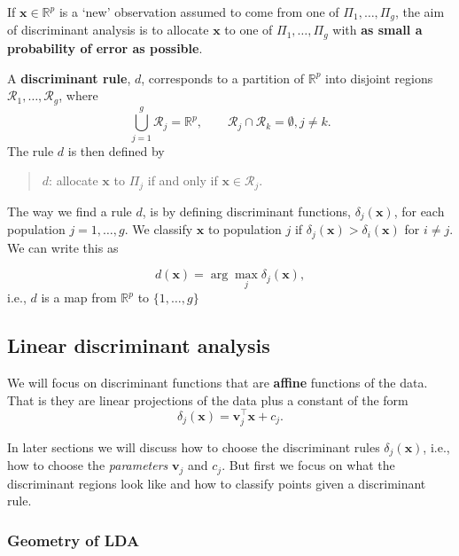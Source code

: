 \documentclass[
]{book}
\theoremstyle{definition}
\theoremstyle{definition}
\theoremstyle{definition}
\theoremstyle{definition}
\theoremstyle{remark}
\begin{document}
If \(\mathbf x\in \mathbb R^p\) is a `new' observation assumed to come from one of \(\Pi_1, \ldots , \Pi_g\), the aim of discriminant analysis is to allocate \(\mathbf x\) to one of \(\Pi_1, \ldots , \Pi_g\) with \textbf{as small a
probability of error as possible}.

A \textbf{discriminant rule}, \(d\), corresponds to a partition of \(\mathbb R^p\) into disjoint regions \(\mathcal R_1, \ldots, \mathcal R_g\), where
\[\bigcup_{j=1}^g \mathcal R_j = \mathbb R^p, \qquad \mathcal R_j \cap \mathcal R_k = \emptyset, j \neq k.\]
The rule \(d\) is then defined by

\begin{quote}
\(d\): allocate \(\mathbf x\) to \(\Pi_j\) if and only if \(\mathbf x\in \mathcal R_j\).
\end{quote}

The way we find a rule \(d\), is by defining discriminant functions, \(\delta_j(\mathbf x)\), for each population \(j=1, \ldots, g\). We classify \(\mathbf x\) to population \(j\) if \(\delta_j(\mathbf x)>\delta_i(\mathbf x)\) for \(i \not = j\). We can write this as

\[d(\mathbf x) = \arg \max_j \delta_j(\mathbf x),\]
i.e., \(d\) is a map from \(\mathbb{R}^p\) to \(\{1, \ldots, g\}\)

\hypertarget{linear-discriminant-analysis}{%
\subsection*{Linear discriminant analysis}\label{linear-discriminant-analysis}}

We will focus on discriminant functions that are \textbf{affine} functions of the data. That is they are linear projections of the data plus a constant of the form
\begin{equation}
\delta_j(\mathbf x) = \mathbf v_j^\top \mathbf x+ c_j.  \label{eq:ldadiscrim}
\end{equation}

In later sections we will discuss how to choose the discriminant rules \(\delta_j(\mathbf x)\), i.e., how to choose the \emph{parameters} \(\mathbf v_j\) and \(c_j\). But first we focus on what the
discriminant regions look like and how to classify points given a discriminant rule.

\hypertarget{geometry-of-lda}{%
\subsubsection*{Geometry of LDA}\label{geometry-of-lda}}
\end{document}
